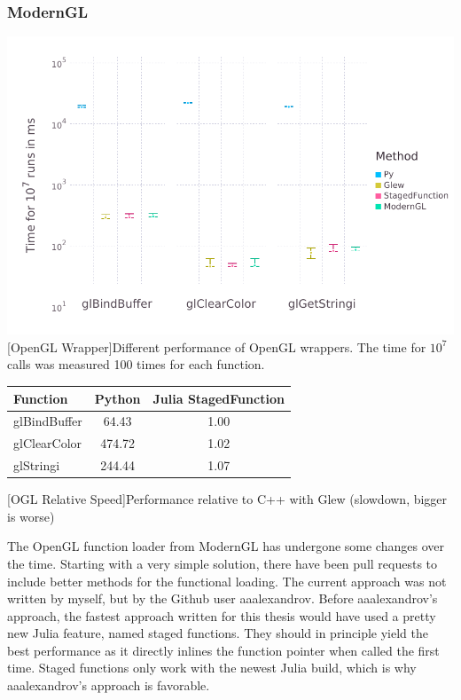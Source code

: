 \subsubsection{ModernGL}
\vspace{1em}
\begin{minipage}{\linewidth}
    \centering
    \includegraphics[width=0.9\linewidth]{graphics/glbench.pdf}
    [OpenGL Wrapper]{Different performance of OpenGL wrappers. The time for $10^7$ calls was measured 100 times for each function.}
    \label{fig:openglwrapper}
\end{minipage}
\begin{table}[htbp]
    \centering
    \begin{tabular}{l|c|c}
        \hline
        \textbf{Function}   & \textbf{Python}    & \textbf{Julia StagedFunction} \\
        \hline
        glBindBuffer        & 64.43              & 1.00\\
        glClearColor        & 474.72             & 1.02\\
        glStringi           & 244.44             & 1.07\\
    \end{tabular}
    [OGL Relative Speed]{Performance relative to C++ with Glew (slowdown, bigger is worse)}
    \label{table:relativespeedoglw}
\end{table}

The OpenGL function loader from ModernGL has undergone some changes over the time. 
Starting with a very simple solution, there have been pull requests to include better methods for the functional loading.
The current approach was not written by myself, but by the Github user aaalexandrov.
Before aaalexandrov's approach, the fastest approach written for this thesis would have used a pretty new Julia feature, named staged functions. 
They should in principle yield the best performance as it directly inlines the function pointer when called the first time.
Staged functions only work with the newest Julia build, which is why aaalexandrov's approach is favorable.

